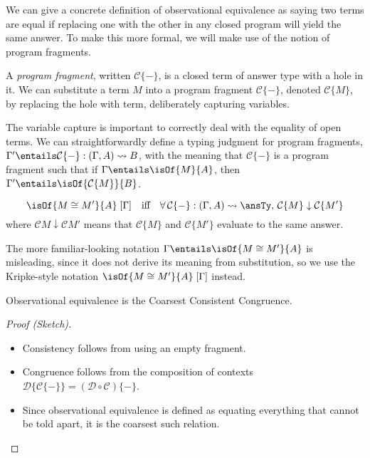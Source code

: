 \documentclass[letterpaper]{article}
\newcommand\CC{\mathcal C}
\newcommand\DD{\mathcal D}
\begin{document}
We can give a concrete definition of observational equivalence as saying two terms are equal if replacing one with the other in any closed program will yield the same answer.
To make this more formal, we will make use of the notion of program fragments.

\begin{definition}
A \emph{program fragment}, written \(\CC\{-\}\), is a closed term of answer type with a hole in it.
We can substitute a term \(M\) into a program fragment \(\CC\{-\}\), denoted \(\CC\{M\}\), by replacing the hole with term, deliberately capturing variables.
\end{definition}

The variable capture is important to correctly deal with the equality of open terms.
We can straightforwardly define a typing judgment for program fragments, \(\Gamma' \entails \CC\{-\} : (\Gamma, A) \rightsquigarrow B\), with the meaning that \(\CC\{-\}\) is a program fragment such that if \(\Gamma \entails \isOf{M}{A}\), then \(\Gamma' \entails \isOf{\CC\{M\}}{B}\).

\begin{definition}
\[\isOf{M \cong M'}{A} \; [\Gamma] \quad\text{iff}\quad \forall\, \CC\{-\} : (\Gamma, A) \rightsquigarrow \ansTy,\, \CC\{M\} \downarrow \CC\{M'\}\]
where \(\CC{M} \downarrow \CC{M'}\) means that \(\CC\{M\}\) and \(\CC\{M'\}\) evaluate to the same answer.
\end{definition}

The more familiar-looking notation \(\Gamma \entails \isOf{M \cong M'}{A}\) is misleading, since it does not derive its meaning from substitution, so we use the Kripke-style notation \(\isOf{M \cong M'}{A} \; [\Gamma]\) instead.

\begin{theorem}
Observational equivalence is the Coarsest Consistent Congruence.
\end{theorem}
\begin{proof}[Proof (Sketch)]
\!
\begin{itemize}
\item Consistency follows from using an empty fragment.
\item Congruence follows from the composition of contexts \(\DD\{\CC\{-\}\} = (\DD \circ \CC)\{-\}\).
\item Since observational equivalence is defined as equating everything that cannot be told apart, it is the coarsest such relation.
\end{itemize}
\end{proof}
\end{document}
